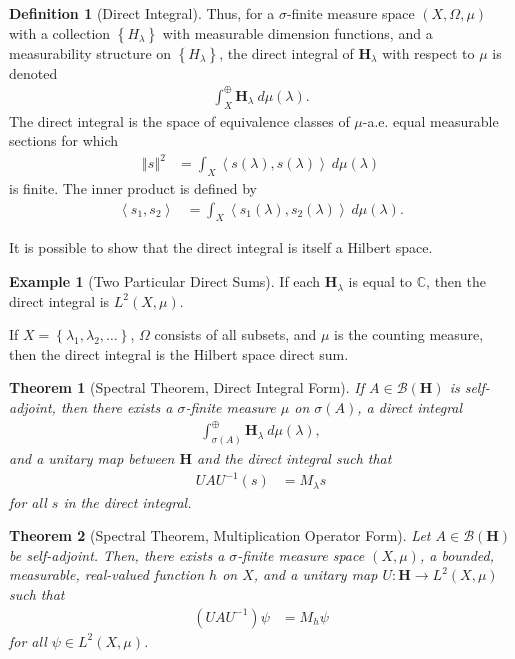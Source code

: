 \documentclass[10pt]{extarticle}
\newcommand{\C}{\mathbb{C}}
\newcommand{\set}[1]{\left\{#1\right\}}
\newcommand{\iprod}[2]{\left\langle #1,#2\right\rangle}
\newcommand{\norm}[1]{\left\Vert #1\right\Vert}
\theoremstyle{plain}
\newtheorem*{theorem}{Theorem}%
\theoremstyle{definition}
\newtheorem*{definition}{Definition}
\newtheorem*{example}{Example}
\theoremstyle{remark}
\renewcommand{\newline}{\hfill\break}
\begin{document}
\begin{definition}[Direct Integral]
    Thus, for a $\sigma$-finite measure space $(X,\Omega,\mu)$ with a collection $\set{H_{\lambda}}$ with measurable dimension functions, and a measurability structure on $\set{H_{\lambda}}$, the direct integral of $\mathbf{H}_{\lambda}$ with respect to $\mu$ is denoted
    \begin{align*}
      \int_{X}^{\oplus} \mathbf{H}_{\lambda}\:d\mu(\lambda).
    \end{align*}
    The direct integral is the space of equivalence classes of $\mu$-a.e. equal measurable sections for which
    \begin{align*}
      \norm{s}^2 &= \int_{X}^{} \iprod{s(\lambda)}{s(\lambda)}\:d\mu(\lambda)
    \end{align*}
    is finite. The inner product is defined by
    \begin{align*}
      \iprod{s_1}{s_2} &= \int_{X}^{} \iprod{s_1(\lambda)}{s_2(\lambda)}\:d\mu(\lambda).
    \end{align*}
  \end{definition}
  It is possible to show that the direct integral is itself a Hilbert space.
  \begin{example}[Two Particular Direct Sums]
    If each $\mathbf{H}_{\lambda}$ is equal to $\C$, then the direct integral is $L^{2}\left(X,\mu\right)$.\newline

    If $X = \set{\lambda_1,\lambda_2,\dots}$, $\Omega$ consists of all subsets, and $\mu$ is the counting measure, then the direct integral is the Hilbert space direct sum.
  \end{example}
  \begin{theorem}[Spectral Theorem, Direct Integral Form]
    If $A \in \mathcal{B}\left(\mathbf{H}\right)$ is self-adjoint, then there exists a $\sigma$-finite measure $\mu$ on $\sigma(A)$, a direct integral
    \begin{align*}
      \int_{\sigma(A)}^{\oplus} \mathbf{H}_{\lambda}\:d\mu(\lambda),
    \end{align*}
    and a unitary map between $\mathbf{H}$ and the direct integral such that
    \begin{align*}
      UAU^{-1}(s) &= M_{\lambda}s
    \end{align*}
    for all $s$ in the direct integral.
  \end{theorem}
  \begin{theorem}[Spectral Theorem, Multiplication Operator Form]
    Let $A\in \mathcal{B}\left(\mathbf{H}\right)$ be self-adjoint. Then, there exists a $\sigma$-finite measure space $(X,\mu)$, a bounded, measurable, real-valued function $h$ on $X$, and a unitary map $U: \mathbf{H}\rightarrow L^{2}(X,\mu)$ such that
    \begin{align*}
      \left(UAU^{-1}\right)\psi &= M_{h}\psi
    \end{align*}
    for all $\psi \in L^{2}\left(X,\mu\right)$.
  \end{theorem}
\end{document}
